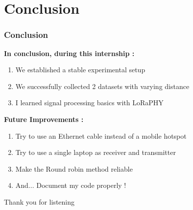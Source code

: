 




\section{Conclusion}

\begin{frame}
  \frametitle{Conclusion}
  \textbf{In conclusion, during this internship :}
  \begin{enumerate}
    \item We established a stable experimental setup 
    \item We successfully collected 2 datasets with varying distance
    \item I learned signal processing basics with LoRaPHY
  \end{enumerate}

  \pause


  \textbf{Future Improvements :}
  \begin{enumerate}
    \item Try to use an Ethernet cable instead of a mobile hotspot 
    \item Try to use a single laptop as receiver and transmitter 
    \item Make the Round robin method reliable
    \item And... Document my code properly !
  \end{enumerate}
\end{frame}

\begin{frame}

  \centering
  \huge Thank you for listening
  
\end{frame}

